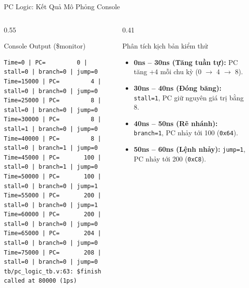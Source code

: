 \begin{frame}[fragile]{PC Logic: Kết Quả Mô Phỏng Console}
    \begin{columns}
        \begin{column}{0.55\textwidth}
            \begin{block}{Console Output (\$monitor)}
                \begin{lstlisting}[basicstyle=\fontsize{6.5pt}{7.5pt}\selectfont\ttfamily, numbers=none]
Time=0 | PC=         0 | stall=0 | branch=0 | jump=0
Time=15000 | PC=         4 | stall=0 | branch=0 | jump=0
Time=25000 | PC=         8 | stall=0 | branch=0 | jump=0
Time=30000 | PC=         8 | stall=1 | branch=0 | jump=0
Time=40000 | PC=         8 | stall=0 | branch=1 | jump=0
Time=45000 | PC=       100 | stall=0 | branch=1 | jump=0
Time=50000 | PC=       100 | stall=0 | branch=0 | jump=1
Time=55000 | PC=       200 | stall=0 | branch=0 | jump=1
Time=60000 | PC=       200 | stall=0 | branch=0 | jump=0
Time=65000 | PC=       204 | stall=0 | branch=0 | jump=0
Time=75000 | PC=       208 | stall=0 | branch=0 | jump=0
tb/pc_logic_tb.v:63: $finish called at 80000 (1ps)
                \end{lstlisting}
            \end{block}
        \end{column}
        
        \begin{column}{0.41\textwidth}
            \begin{block}{Phân tích kịch bản kiểm thử}
                \scriptsize
                \begin{itemize}
                    \item \textbf{0ns -- 30ns (Tăng tuần tự):} PC tăng +4 mỗi chu kỳ (0 $\rightarrow$ 4 $\rightarrow$ 8).
                    \item \textbf{30ns -- 40ns (Đóng băng):} \texttt{stall=1}, PC giữ nguyên giá trị bằng 8.
                    \item \textbf{40ns -- 50ns (Rẽ nhánh):} \texttt{branch=1}, PC nhảy tới 100 (\texttt{0x64}).
                    \item \textbf{50ns -- 60ns (Lệnh nhảy):} \texttt{jump=1}, PC nhảy tới 200 (\texttt{0xC8}).
                \end{itemize}
            \end{block}
        \end{column}
    \end{columns}
\end{frame}


